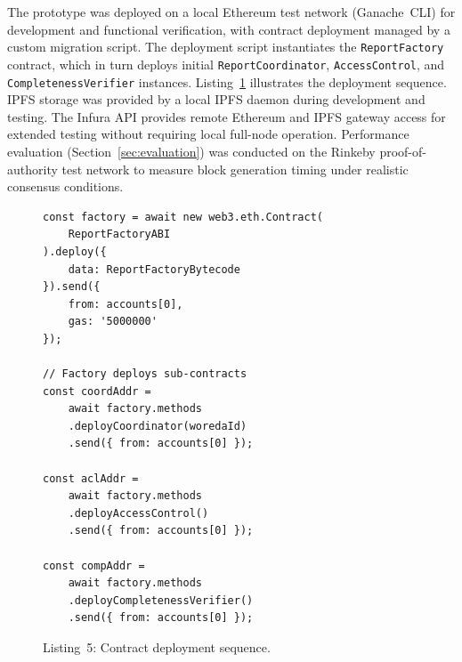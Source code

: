 \documentclass[AMA,LATO1COL]{WileyNJD-v2}
\begin{document}
The prototype was deployed on a local Ethereum test network (Ganache~CLI) for development and functional verification, with contract deployment managed by a custom migration script. The deployment script instantiates the \texttt{ReportFactory} contract, which in turn deploys initial \texttt{ReportCoordinator}, \texttt{AccessControl}, and \texttt{CompletenessVerifier} instances. Listing~\ref{lst:deploy} illustrates the deployment sequence. IPFS storage was provided by a local IPFS daemon during development and testing. The Infura API provides remote Ethereum and IPFS gateway access for extended testing without requiring local full-node operation. Performance evaluation (Section~\ref{sec:evaluation}) was conducted on the Rinkeby proof-of-authority test network to measure block generation timing under realistic consensus conditions.

\begin{figure}[!ht]
\begin{verbatim}
const factory = await new web3.eth.Contract(
    ReportFactoryABI
).deploy({
    data: ReportFactoryBytecode
}).send({
    from: accounts[0],
    gas: '5000000'
});

// Factory deploys sub-contracts
const coordAddr =
    await factory.methods
    .deployCoordinator(woredaId)
    .send({ from: accounts[0] });

const aclAddr =
    await factory.methods
    .deployAccessControl()
    .send({ from: accounts[0] });

const compAddr =
    await factory.methods
    .deployCompletenessVerifier()
    .send({ from: accounts[0] });
\end{verbatim}
\caption*{Listing~5: Contract deployment sequence.}\label{lst:deploy}
\end{figure}

%
%
%
\end{document}
